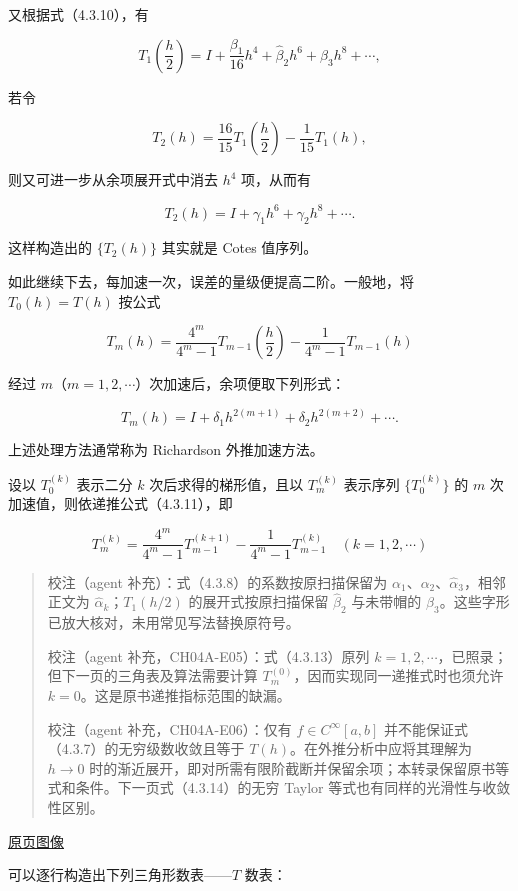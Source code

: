 \documentclass[
  10pt,
  fontset=fandol]{ctexart}
\begin{document}
又根据式（4.3.10），有

\[
T_1\left(\frac h2\right)=I+\frac{\beta_1}{16}h^4+\hat\beta_2h^6+\beta_3h^8+\cdots,
\]

若令

\[
T_2(h)=\frac{16}{15}T_1\left(\frac h2\right)-\frac1{15}T_1(h),
\]

则又可进一步从余项展开式中消去 \(h^4\) 项，从而有

\[
T_2(h)=I+\gamma_1h^6+\gamma_2h^8+\cdots.
\]

这样构造出的 \(\{T_2(h)\}\) 其实就是 Cotes 值序列。

如此继续下去，每加速一次，误差的量级便提高二阶。一般地，将 \(T_0(h)=T(h)\) 按公式

\[
T_m(h)=\frac{4^m}{4^m-1}T_{m-1}\left(\frac h2\right)-\frac1{4^m-1}T_{m-1}(h)
\tag{4.3.11}
\]

经过 \(m\)（\(m=1,2,\cdots\)）次加速后，余项便取下列形式：

\[
T_m(h)=I+\delta_1h^{2(m+1)}+\delta_2h^{2(m+2)}+\cdots.
\tag{4.3.12}
\]

上述处理方法通常称为 Richardson 外推加速方法。

设以 \(T_0^{(k)}\) 表示二分 \(k\) 次后求得的梯形值，且以 \(T_m^{(k)}\) 表示序列 \(\{T_0^{(k)}\}\) 的 \(m\) 次加速值，则依递推公式（4.3.11），即

\[
T_m^{(k)}=\frac{4^m}{4^m-1}T_{m-1}^{(k+1)}-\frac1{4^m-1}T_{m-1}^{(k)}\quad(k=1,2,\cdots)
\tag{4.3.13}
\]

\begin{quote}
校注（agent 补充）：式（4.3.8）的系数按原扫描保留为 \(\alpha_1\)、\(\alpha_2\)、\(\hat\alpha_3\)，相邻正文为 \(\hat\alpha_k\)；\(T_1(h/2)\) 的展开式按原扫描保留 \(\hat\beta_2\) 与未带帽的 \(\beta_3\)。这些字形已放大核对，未用常见写法替换原符号。

校注（agent 补充，CH04A-E05）：式（4.3.13）原列 \(k=1,2,\cdots\)，已照录；但下一页的三角表及算法需要计算 \(T_m^{(0)}\)，因而实现同一递推式时也须允许 \(k=0\)。这是原书递推指标范围的缺漏。

校注（agent 补充，CH04A-E06）：仅有 \(f\in C^\infty[a,b]\) 并不能保证式（4.3.7）的无穷级数收敛且等于 \(T(h)\)。在外推分析中应将其理解为 \(h\to0\) 时的渐近展开，即对所需有限阶截断并保留余项；本转录保留原书等式和条件。下一页式（4.3.14）的无穷 Taylor 等式也有同样的光滑性与收敛性区别。
\end{quote}

\href{../../source-images/pdf-105.jpeg}{原页图像}

可以逐行构造出下列三角形数表------\(T\) 数表：
\end{document}
